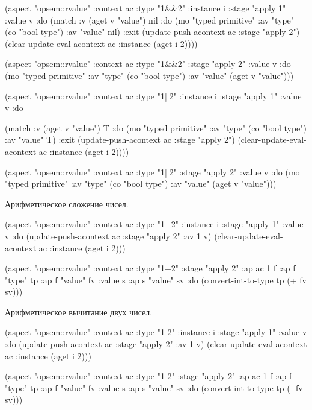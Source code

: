 \documentclass[12pt,twoside,russian]{article}
\begin{document}
\begin{ABMLCode}
(aspect "opsem::rvalue" :context ac :type "1&&2" :instance i 
  :stage "apply 1" :value v :do 
  (match :v (aget v "value") nil 
  :do (mo "typed primitive" :av "type" (co "bool type") :av "value" nil) 
  :exit (update-push-acontext ac :stage "apply 2")
        (clear-update-eval-acontext ac :instance (aget i 2))))

(aspect "opsem::rvalue" :context ac :type "1&&2" 
  :stage "apply 2" :value v :do  
  (mo "typed primitive" :av "type" (co "bool type") 
                        :av "value" (aget v "value")))

(aspect "opsem::rvalue" :context ac :type "1||2" :instance i 
  :stage "apply 1" :value v :do 
  
  (match :v (aget v "value") T 
  :do (mo "typed primitive" :av "type" (co "bool type") :av "value" T) 
  :exit (update-push-acontext ac :stage "apply 2")
        (clear-update-eval-acontext ac :instance (aget i 2))))

(aspect "opsem::rvalue" :context ac :type "1||2" 
  :stage "apply 2" :value v :do   
  (mo "typed primitive" :av "type" (co "bool type") 
                        :av "value" (aget v "value")))
\end{ABMLCode}

Арифметическое сложение чисел.

\begin{ABMLCode}
(aspect "opsem::rvalue" :context ac :type "1+2" :instance i 
  :stage "apply 1" :value v :do 
  (update-push-acontext ac :stage "apply 2" :av 1 v)
  (clear-update-eval-acontext ac :instance (aget i 2)))

(aspect "opsem::rvalue" :context ac :type "1+2" :stage "apply 2" 
  :ap ac 1 f :ap f "type" tp :ap f "value" fv :value s 
  :ap s "value" sv :do 
  (convert-int-to-type tp (+ fv sv)))
\end{ABMLCode}

Арифметическое вычитание двух чисел.

\begin{ABMLCode}
(aspect "opsem::rvalue" :context ac :type "1-2" :instance i 
  :stage "apply 1" :value v :do 
  (update-push-acontext ac :stage "apply 2" :av 1 v)
  (clear-update-eval-acontext ac :instance (aget i 2)))

(aspect "opsem::rvalue" :context ac :type "1-2" :stage "apply 2" 
  :ap ac 1 f :ap f "type" tp :ap f "value" fv :value s 
  :ap s "value" sv :do 
  (convert-int-to-type tp (- fv sv)))
\end{ABMLCode}
\end{document}
